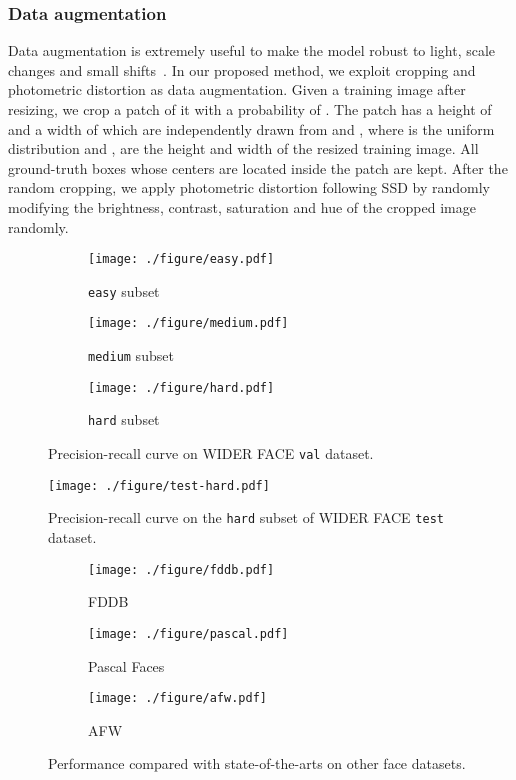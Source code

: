 \documentclass[10pt,twocolumn,letterpaper]{article}
\begin{document}
\subsubsection*{Data augmentation}\label{section:data_augmentation}
Data augmentation is extremely useful to make the model robust to light, scale changes and
small shifts~\cite{liu2016ssd,Tang_2018_ECCV}.
In our proposed method, we exploit cropping and photometric distortion as data
augmentation. Given a training image after resizing,
we crop a patch of it with a probability of
. The patch has a height of  and a width of  which are independently drawn from
 and , where  is the uniform
distribution and ,  are the height and width of the resized training image. All
ground-truth boxes whose centers are located inside the patch are kept.
After the random cropping, we apply photometric distortion following SSD by randomly modifying the brightness, contrast, saturation and
hue of the cropped image randomly.
\begin{figure*}[!t]
  \centering
  \begin{subfigure}[b]{0.33\linewidth}
    \centering\texttt{[image: ./figure/easy.pdf]}
    \caption*{\texttt{easy} subset}
  \end{subfigure}
   \begin{subfigure}[b]{0.33\linewidth}
    \centering\texttt{[image: ./figure/medium.pdf]}
    \caption*{\texttt{medium} subset}
  \end{subfigure}\begin{subfigure}[b]{0.33\linewidth}
    \centering\texttt{[image: ./figure/hard.pdf]}
    \caption*{\texttt{hard} subset}
  \end{subfigure}\caption{Precision-recall curve on WIDER FACE \texttt{val} dataset.}
\label{fig:perf_widerface}
\end{figure*}

\begin{figure}[!t]
    \centering\texttt{[image: ./figure/test-hard.pdf]}
\caption{Precision-recall curve on the \texttt{hard} subset of WIDER FACE \texttt{test} dataset.}
\label{fig:perf_widerface_test}
\end{figure}

\begin{figure*}[!t]
  \centering
\begin{subfigure}[b]{0.33\linewidth}
    \centering\texttt{[image: ./figure/fddb.pdf]}
    \caption{FDDB}\label{fig:fddb}
  \end{subfigure}
    \begin{subfigure}[b]{0.33\linewidth}
    \centering\texttt{[image: ./figure/pascal.pdf]}
    \caption{Pascal Faces}\label{fig:pascal}
  \end{subfigure}\begin{subfigure}[b]{0.33\linewidth}
    \centering\texttt{[image: ./figure/afw.pdf]}
    \caption{AFW}\label{fig:afw}
  \end{subfigure}
\caption{Performance compared with state-of-the-arts on other face datasets.}
\label{fig:perf_other}
\end{figure*}
\end{document}
